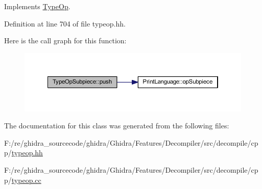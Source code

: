 Implements \mbox{\hyperlink{class_type_op_ac9c9544203ed74dabe6ac662b653b2af}{Type\+Op}}.



Definition at line 704 of file typeop.\+hh.

Here is the call graph for this function\+:
\nopagebreak
\begin{figure}[H]
\begin{center}
\leavevmode
\includegraphics[width=350pt]{class_type_op_subpiece_a0ef689e39ee81e6c30f6d92a2024c4dd_cgraph}
\end{center}
\end{figure}


The documentation for this class was generated from the following files\+:\begin{DoxyCompactItemize}
\item 
F\+:/re/ghidra\+\_\+sourcecode/ghidra/\+Ghidra/\+Features/\+Decompiler/src/decompile/cpp/\mbox{\hyperlink{typeop_8hh}{typeop.\+hh}}\item 
F\+:/re/ghidra\+\_\+sourcecode/ghidra/\+Ghidra/\+Features/\+Decompiler/src/decompile/cpp/\mbox{\hyperlink{typeop_8cc}{typeop.\+cc}}\end{DoxyCompactItemize}
